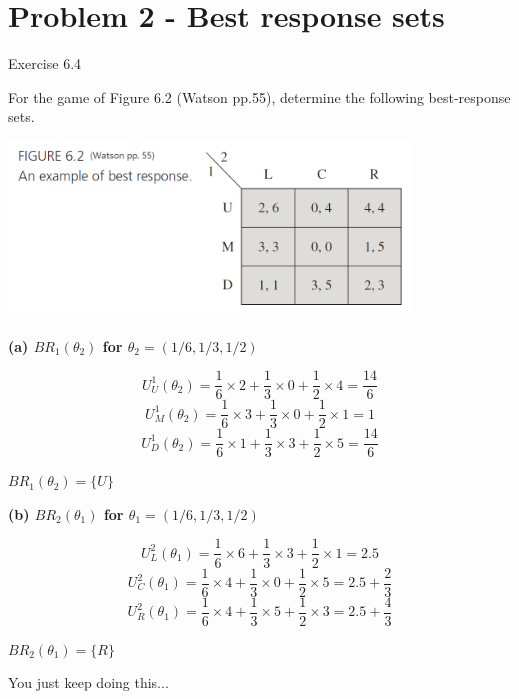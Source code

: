 \documentclass{article}
\begin{document}
\bigskip

\newpage

\section{Problem 2 - Best response sets} 

Exercise 6.4 

For the game of Figure 6.2 (Watson pp.55), determine the following best-response sets.


{\includegraphics[width=0.8\textwidth]{7.f6_2}
\label{fig:f6_2}}
\vspace{2mm}


\begin{mdframed}[backgroundcolor=blue!20,linecolor=white]

\textbf{(a) $BR_1(\theta_2)$ for $\theta_2 = (1/6,1/3,1/2)$}

$$U^1_U(\theta_2) = \frac{1}{6} \times 2 + \frac{1}{3} \times 0 + \frac{1}{2}\times 4=\frac{14}{6}$$
$$U^1_M(\theta_2) = \frac{1}{6} \times 3 + \frac{1}{3} \times 0 + \frac{1}{2}\times 1=1$$
$$U^1_D(\theta_2) = \frac{1}{6} \times 1 + \frac{1}{3} \times 3 + \frac{1}{2}\times 5=\frac{14}{6}$$

$BR_1(\theta_2)=\{U\}$

\medskip

\textbf{(b) $BR_2(\theta_1)$ for $\theta_1 = (1/6,1/3,1/2)$}

$$U^2_L(\theta_1) = \frac{1}{6} \times 6 + \frac{1}{3} \times 3 + \frac{1}{2}\times 1=2.5$$
$$U^2_C(\theta_1) = \frac{1}{6} \times 4 + \frac{1}{3} \times 0 + \frac{1}{2}\times 5=2.5 + \frac{2}{3}$$
$$U^2_R(\theta_1) = \frac{1}{6} \times 4 + \frac{1}{3} \times 5 + \frac{1}{2}\times 3=2.5 + \frac{4}{3}$$

$BR_2(\theta_1)=\{R\}$

You just keep doing this...
\end{mdframed}
\end{document}
